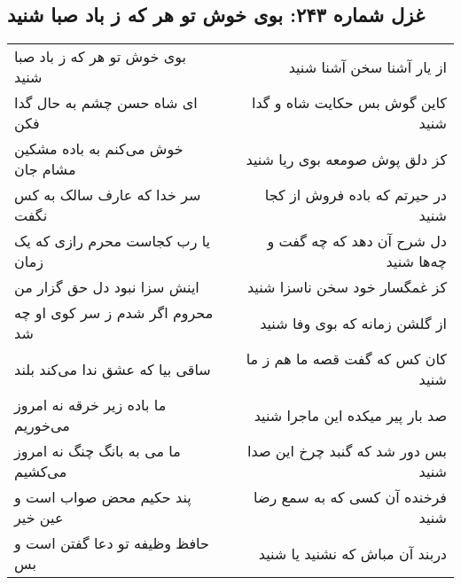 \begin{center}
\section*{غزل شماره ۲۴۳: بوی خوش تو هر که ز باد صبا شنید}
\label{sec:sh243}
\begin{longtable}{l p{0.5cm} r}
بوی خوش تو هر که ز باد صبا شنید
&&
از یار آشنا سخن آشنا شنید
\\
ای شاه حسن چشم به حال گدا فکن
&&
کاین گوش بس حکایت شاه و گدا شنید
\\
خوش می‌کنم به باده مشکین مشام جان
&&
کز دلق پوش صومعه بوی ریا شنید
\\
سر خدا که عارف سالک به کس نگفت
&&
در حیرتم که باده فروش از کجا شنید
\\
یا رب کجاست محرم رازی که یک زمان
&&
دل شرح آن دهد که چه گفت و چه‌ها شنید
\\
اینش سزا نبود دل حق گزار من
&&
کز غمگسار خود سخن ناسزا شنید
\\
محروم اگر شدم ز سر کوی او چه شد
&&
از گلشن زمانه که بوی وفا شنید
\\
ساقی بیا که عشق ندا می‌کند بلند
&&
کان کس که گفت قصه ما هم ز ما شنید
\\
ما باده زیر خرقه نه امروز می‌خوریم
&&
صد بار پیر میکده این ماجرا شنید
\\
ما می به بانگ چنگ نه امروز می‌کشیم
&&
بس دور شد که گنبد چرخ این صدا شنید
\\
پند حکیم محض صواب است و عین خیر
&&
فرخنده آن کسی که به سمع رضا شنید
\\
حافظ وظیفه تو دعا گفتن است و بس
&&
دربند آن مباش که نشنید یا شنید
\\
\end{longtable}
\end{center}
